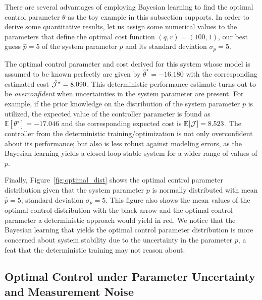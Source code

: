 There are several advantages of employing Bayesian learning to find the optimal
control parameter $\theta$ as the toy example in this subsection supports. 
%
In order to derive some quantitative results, let us assign some numerical
values to the parameters that define the optimal cost function $(q,r) = (100, 1)$, our best
guess $\hat{p} = 5$ of the system parameter $p$ and its standard deviation $\sigma_p = 5$.


The optimal control parameter and cost derived for this system whose model is
assumed to be known perfectly are given by $\hat{\theta}^\star = -16.180$ with
the corresponding estimated cost $\hat{\mathcal{J}}^\star = 8.090$.
%
This deterministic performance estimate turns out to be \textit{overconfident} when
uncertainties in the system parameter are present. 
%
For example, if the prior knowledge on the distribution of the system parameter
$p$ is utilized, the expected value of the controller parameter is found as
$\mathbb{E}[\theta^\star] = -17.046$ and the corresponding expected cost is
$\mathbb{E}[\mathcal{J}] = 8.523$. 
%
The controller from the deterministic training/optimization is not only
overconfident about its performance; but also is less robust against modeling
errors, as the Bayesian learning yields a closed-loop stable system for a wider
range of values of $p$.

Finally, Figure~\ref{fig:optimal_dist} shows the optimal control parameter
distribution given that the system parameter $p$ is normally distributed with
mean $\hat{p} = 5$, standard deviation $\sigma_p = 5$.
%
This figure also shows the mean values of the optimal control distribution with
the black arrow and the optimal control parameter a deterministic approach would
yield in red. 
%
We notice that the Bayesian learning that yields the optimal control parameter
distribution is more concerned about system stability due to the uncertainty in
the parameter $p$, a feat that the deterministic training may not reason about.

\subsection{Optimal Control under Parameter Uncertainty and Measurement
Noise}

